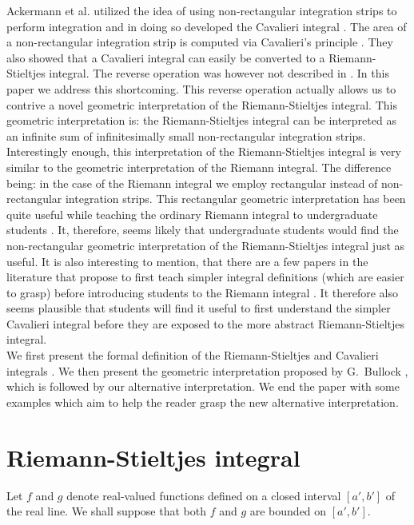 \documentclass{article}
\theoremstyle{theorem}
\theoremstyle{definition}
\begin{document}
\noindent
Ackermann et al. utilized the idea of using non-rectangular integration strips to perform integration
and in doing so developed the Cavalieri integral \cite{ackermann2012}. The area of a non-rectangular integration strip is computed via 
Cavalieri's principle \cite{andersen1985,eves1991, malik1984, wildberger2002, young1985}. They also showed that a Cavalieri integral can easily be converted to a Riemann-Stieltjes integral. The 
reverse operation was however not described in \cite{ackermann2012}. In this paper we address this shortcoming. This 
reverse operation actually allows us to contrive a novel geometric interpretation of the Riemann-Stieltjes integral.
This geometric interpretation is: the Riemann-Stieltjes integral can be interpreted as an infinite sum of infinitesimally small
non-rectangular integration strips. Interestingly enough, this interpretation of the Riemann-Stieltjes integral is very similar 
to the geometric interpretation of the Riemann integral. The difference being: in the case of the Riemann integral we employ 
rectangular instead of non-rectangular integration strips. This rectangular geometric interpretation has been quite useful while 
teaching the ordinary Riemann integral to undergraduate students \cite{jones2015,sealey2014}. It, therefore, seems likely that undergraduate students would find the non-rectangular geometric interpretation
of the Riemann-Stieltjes integral just as useful. It is also interesting to mention, that there are a few papers in the literature that propose to first 
teach simpler integral definitions (which are easier to grasp) before introducing students to the Riemann integral \cite{czarnocha2001,prabhu2008,ruffa2002,zaskis2014}. It therefore also seems plausible that
students will find it useful to first understand the simpler Cavalieri integral before they are exposed to the more abstract Riemann-Stieltjes integral.\\

\noindent
We first present the formal definition of the Riemann-Stieltjes and Cavalieri integrals \cite{bartle1976,ackermann2012}.
We then present the geometric interpretation proposed by G.~Bullock \cite{bullock1988}, which is followed by our alternative interpretation. We end 
the paper with some examples which aim to help the reader grasp the new alternative interpretation.

\section{Riemann-Stieltjes integral}
Let $f$ and $g$ denote real-valued functions defined on a closed interval $[a',b']$ of the real line. We shall suppose that 
both $f$ and $g$ are bounded on $[a',b']$. 
\end{document}
